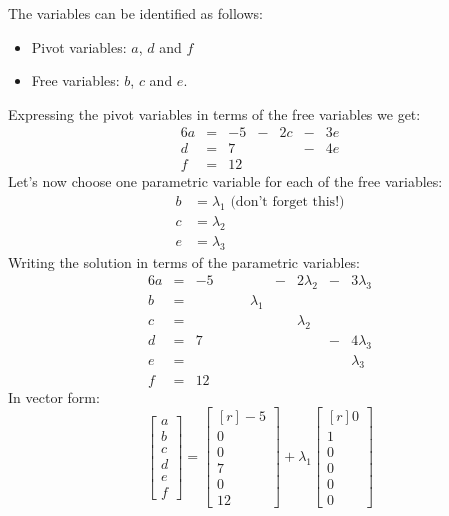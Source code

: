 \documentclass[12pt]{article}
\begin{document}
\begin{enumerate}
The variables can be identified as follows:
\begin{itemize}
\item Pivot variables: $a$, $d$ and $f$
\item Free variables: $b$, $c$ and $e$.
\end{itemize}
Expressing the pivot variables in terms of the free variables we get:
\begin{alignat*}{6}
a &{}={}& -5 &{}-{}& 2c &{}-{}& 3e\\
d &{}={}&  7 &{}{}&     &{}-{}& 4e\\
f &{}={}& 12 &{}{}&     &{}{}&
\end{alignat*} 
Let's now choose one parametric variable for each of the free variables:
\begin{align*}
b &= \lambda_1 \text{ (don't forget this!)}\\
c &= \lambda_2\\
e &= \lambda_3
\end{align*}
Writing the solution in terms of the parametric variables:
\begin{alignat*}{6}
a &{}={}& -5 &{}\quad{}&           &{}-{}& 2\lambda_2 &{}-{}& 3\lambda_3\\
b &{}={}&    &{}{}& \lambda_1 &{}{}&             &{}{}&\\
c &{}={}&    &{}{}&           &{}{}&  \lambda_2  &{}{}&\\
d &{}={}&  7 &{}{}&           &{}{}&             &{}-{}& 4\lambda_3\\
e &{}={}&    &{}{}&           &{}{}&             &{}{}&   \lambda_3\\
f &{}={}& 12
\end{alignat*} 
In vector form:
\[
\begin{bmatrix}a\\b\\c\\d\\e\\f\end{bmatrix}=
\begin{bmatrix*}[r]-5\\ 0\\ 0\\ 7\\ 0\\ 12\end{bmatrix*}
+\lambda_1\begin{bmatrix*}[r] 0\\ 1\\ 0\\  0\\  0\\ 0 \end{bmatrix*}
\]
\end{enumerate}
\end{document}
